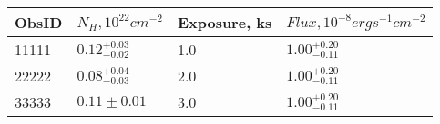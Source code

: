 \begin{tabular}{llll}
\toprule
 ObsID &  $N_H, 10^{22} cm^{-2}$ & Exposure, ks & $ Flux, 10^{-8} erg s^{-1} cm^{-2}$ \\
\midrule
 11111 &  $0.12^{+0.03}_{-0.02}$ &          1.0 &              $1.00^{+0.20}_{-0.11}$ \\
 22222 &  $0.08^{+0.04}_{-0.03}$ &          2.0 &              $1.00^{+0.20}_{-0.11}$ \\
 33333 &           $0.11\pm0.01$ &          3.0 &              $1.00^{+0.20}_{-0.11}$ \\
\bottomrule
\end{tabular}
